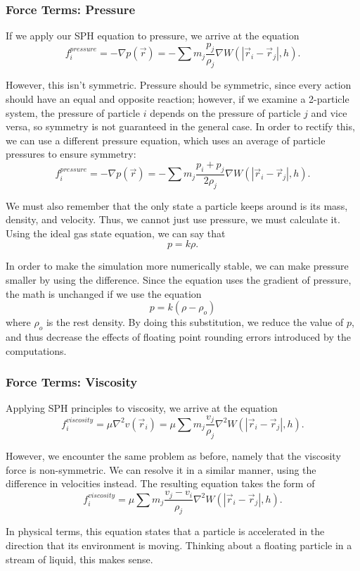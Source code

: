 \documentclass[a4paper]{article}
\begin{document}
\subsubsection{Force Terms: Pressure}
If we apply our SPH equation to pressure, we arrive at the equation
\[f^{pressure}_i = -\nabla p(\vec r) = -\sum m_j \frac{p_j}{\rho_j}\nabla W(|\vec r_i - \vec r_j|, h).\]


However, this isn't symmetric. Pressure should be symmetric, since every action should have an equal and opposite reaction; however, if we examine a 2-particle system, the pressure of particle $i$ depends on the pressure of particle $j$ and vice versa, so symmetry is not guaranteed in the general case. In order to rectify this, we can use a different pressure equation, which uses an average of particle pressures to ensure symmetry:
\[f^{pressure}_i = -\nabla p(\vec r) = -\sum m_j \frac{p_i + p_j}{2\rho_j}\nabla W(|\vec r_i - \vec r_j|, h).\]

We must also remember that the only state a particle keeps around is its mass, density, and velocity. Thus, we cannot just use pressure, we must calculate it. Using the ideal gas state equation, we can say that
\[p = k\rho.\]

In order to make the simulation more numerically stable, we can make pressure smaller by using the difference. Since the equation uses the gradient of pressure, the math is unchanged if we use the equation
\[p = k(\rho - \rho_o)\]
where $\rho_o$ is the rest density. By doing this substitution, we reduce the value of $p$, and thus decrease the effects of floating point rounding errors introduced by the computations.

\subsubsection{Force Terms: Viscosity}
Applying SPH principles to viscosity, we arrive at the equation
\[f^{viscosity}_i = \mu\nabla^2 v(\vec r_i) = \mu \sum m_j \frac{v_j}{\rho_j} \nabla^2 W(|\vec r_i - \vec r_j|, h).\]

However, we encounter the same problem as before, namely that the viscosity force is non-symmetric. We can resolve it in a similar manner, using the difference in velocities instead. The resulting equation takes the form of
\[f^{viscosity}_i = \mu \sum m_j \frac{v_j-v_i}{\rho_j} \nabla^2 W(|\vec r_i - \vec r_j|, h).\]

In physical terms, this equation states that a particle is accelerated in the direction that its environment is moving. Thinking about a floating particle in a stream of liquid, this makes sense.
\end{document}
